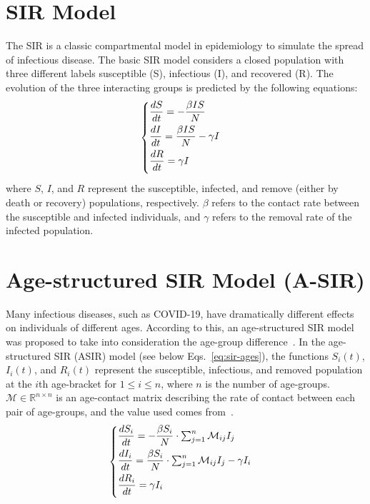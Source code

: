\section{SIR Model}
\label{appendix:sir}
The SIR \cite{anderson1991discussion} is a classic compartmental model in epidemiology to simulate the spread of infectious disease. The basic SIR model considers a closed population with three different labels susceptible (S), infectious (I), and recovered (R).
The evolution of the three interacting groups is predicted by the following equations:
\begin{equation}
\begin{cases}
\dfrac{dS}{dt} = -\dfrac{\beta IS}{N} \vspace{1ex} \\
\dfrac{dI}{dt} = \dfrac{\beta IS}{N} - \gamma I\vspace{1ex} \\
\dfrac{dR}{dt} = \gamma I \vspace{1ex}
\end{cases}
\label{eq:sir}
\end{equation}
where $S$, $I$, and $R$ represent the susceptible, infected, and remove (either by death or recovery) populations, respectively. $\beta$ refers to the contact rate between the susceptible and infected individuals, and $\gamma$ refers to the removal rate of the infected population. 


\section{Age-structured SIR Model (A-SIR)}
\label{appendix:asir}
Many infectious diseases, such as COVID-19, have dramatically different effects on individuals of different ages. 
According to this, an age-structured SIR model was proposed to take into consideration the age-group difference~\cite{ram2021modified}. 
In the age-structured SIR (ASIR) model (see below Eqs.~\ref{eq:sir-ages}), the functions $S_i(t)$, $I_i(t)$, and $R_i(t)$ represent the susceptible, infectious, and removed population at the $i$th age-bracket for $1\leq i \leq n$, where $n$ is the number of age-groups. $\mathcal{M}\in \mathbb{R}^{n\times n}$ is an age-contact matrix describing the rate of contact between each pair of age-groups, and the value used comes from~\cite{ram2021modified}.
\begin{equation}
\begin{cases}
\dfrac{dS_{i}}{dt} = - \dfrac{\beta S_{i}}{N}\cdot \sum ^{n}_{j=1}\mathcal{M}_{ij} I_{j}\vspace{1ex} \\
\dfrac{dI_{i}}{dt} =  \dfrac{\beta S_{i}}{N}\cdot \sum ^{n}_{j=1}\mathcal{M}_{ij} I_{j} - \gamma I_{i}\vspace{1ex} \\
\dfrac{dR_{i}}{dt} = \gamma I_{i} \vspace{1ex}
\end{cases}
\label{eq:sir-ages}
\end{equation}

